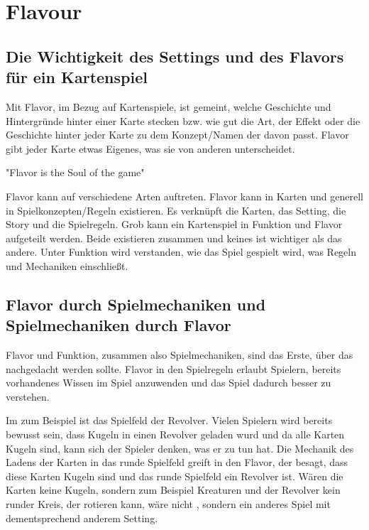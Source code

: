 
\section{Flavour}\label{sec:flavour}

\renewcommand{\kapitelautor}{Autor: Philip Jankovic}

\subsection{Die Wichtigkeit des Settings und des Flavors für ein Kartenspiel}\label{subsec:wichtigkeit-des-flavours}
%
Mit Flavor, im Bezug auf Kartenspiele, ist gemeint, welche Geschichte und Hintergründe hinter einer Karte stecken bzw.
wie gut die Art, der Effekt oder die Geschichte hinter jeder Karte zu dem Konzept/Namen der davon passt.
Flavor gibt jeder Karte etwas Eigenes, was sie von anderen unterscheidet.

"Flavor is the Soul of the game"


Flavor kann auf verschiedene Arten auftreten. Flavor kann in Karten und generell in Spielkonzepten/Regeln existieren.
Es verknüpft die Karten, das Setting, die Story und die Spielregeln. Grob kann ein Kartenspiel in Funktion und Flavor aufgeteilt werden.
Beide existieren zusammen und keines ist wichtiger als das andere.
Unter Funktion wird verstanden, wie das Spiel gespielt wird, was Regeln und Mechaniken einschließt.


\subsection{Flavor durch Spielmechaniken und Spielmechaniken durch Flavor}

Flavor und Funktion, zusammen also Spielmechaniken, sind das Erste, über das nachgedacht werden sollte.
Flavor in den Spielregeln erlaubt Spielern, bereits vorhandenes Wissen im Spiel anzuwenden und das Spiel dadurch besser zu verstehen. 


Im \FF zum Beispiel ist das Spielfeld der Revolver. Vielen Spielern wird bereits bewusst sein, dass Kugeln in einen
Revolver geladen wurd und da alle Karten Kugeln sind, kann sich der Spieler denken, was er zu tun hat. Die Mechanik des Ladens
der Karten in das runde Spielfeld greift in den Flavor, der besagt, dass diese Karten Kugeln sind und das runde Spielfeld
ein Revolver ist. Wären die Karten keine Kugeln, sondern zum Beispiel Kreaturen und der Revolver kein runder Kreis,
der rotieren kann, wäre \FF nicht \FF, sondern ein anderes Spiel mit dementsprechend anderem Setting.


